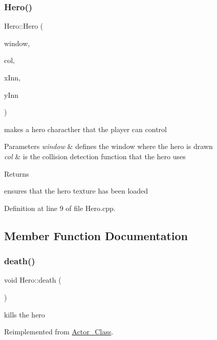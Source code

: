 \subsubsection{\texorpdfstring{Hero()}{Hero()}}
{\footnotesize\ttfamily Hero\+::\+Hero (\begin{DoxyParamCaption}\item[{sf\+::\+Render\+Window \&}]{window,  }\item[{\hyperlink{class_collision}{Collision}}]{col,  }\item[{int}]{x\+Inn,  }\item[{int}]{y\+Inn }\end{DoxyParamCaption})}

makes a hero characther that the player can control 
\begin{DoxyParams}{Parameters}
{\em window} & defines the window where the hero is drawn \\
\hline
{\em col} & is the collision detection function that the hero uses \\
\hline
\end{DoxyParams}
\begin{DoxyReturn}{Returns}

\end{DoxyReturn}
ensures that the hero texture has been loaded 

Definition at line 9 of file Hero.\+cpp.



\subsection{Member Function Documentation}
\hypertarget{class_hero_a62d93b951b0b769c75ddbdf1615660a0}{}\label{class_hero_a62d93b951b0b769c75ddbdf1615660a0} 
\subsubsection{\texorpdfstring{death()}{death()}}
{\footnotesize\ttfamily void Hero\+::death (\begin{DoxyParamCaption}{ }\end{DoxyParamCaption})\hspace{0.3cm}{\ttfamily [virtual]}}



kills the hero 



Reimplemented from \hyperlink{class_actor___class_a9447c6154a674d7e6bdf24ff2874b7a8}{Actor\+\_\+\+Class}.




